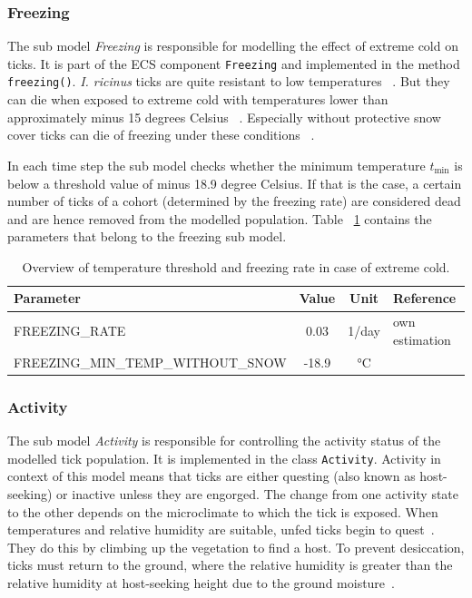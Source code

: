 \documentclass[a4paper, 11pt]{scrartcl}
\newcommand{\inlinecode}[1]{\texttt{\small #1}}
\begin{document}
\subsubsection{Freezing}
The sub model \emph{Freezing} is responsible for modelling the effect of extreme cold on ticks. It is part of the ECS component \inlinecode{Freezing} and implemented in the method \inlinecode{freezing()}. \emph{I. ricinus} ticks are quite resistant to low temperatures ~\parencite{Gray.2009}. But they can die when exposed to extreme cold with temperatures lower than approximately minus 15 degrees Celsius ~\parencite{Ostfeld.2015}. Especially without protective snow cover ticks can die of freezing under these conditions ~\parencite{Jore.2014}.

In each time step the sub model checks whether the minimum temperature $t_{\min}$ is below a threshold value of minus 18.9 degree Celsius. If that is the case, a certain number of ticks of a cohort (determined by the freezing rate) are considered dead and are hence removed from the modelled population. Table ~\ref{tab:freezing_parameters} contains the parameters that belong to the freezing sub model.

\begin{table}[h!]
\caption[Overview of temperature threshold and freezing rate.]{Overview of temperature threshold and freezing rate in case of extreme cold.}
\label{tab:freezing_parameters}
\begin{tabularx}{\textwidth}{lccl}
\toprule
\textbf{Parameter}								& \textbf{Value} & \textbf{Unit}	& \textbf{Reference}  		\\
\midrule
\small{FREEZING\_RATE}		    			 	&   0.03    	& 1/day & own estimation 	\\
\small{FREEZING\_MIN\_TEMP\_WITHOUT\_SNOW}	   	&   -18.9    	& °C &  ~\textcite{Gray.2009} \\
\bottomrule
\end{tabularx}
\end{table}

\subsubsection{Activity}
The sub model \emph{Activity} is responsible for controlling the activity status of the modelled tick population. It is implemented in the class \inlinecode{Activity}. Activity in context of this model means that ticks are either questing (also known as host-seeking) or inactive unless they are engorged. The change from one activity state to the other depends on the microclimate to which the tick is exposed. When temperatures and relative humidity are suitable, unfed ticks begin to quest~\parencite{Perret.2000}. They do this by climbing up the vegetation to find a host. To prevent desiccation, ticks must return to the ground, where the relative humidity is greater than the relative humidity at host-seeking height due to the ground moisture~\parencite{Randolph.2004}.
\end{document}
